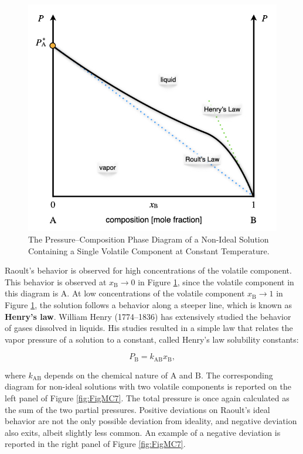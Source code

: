 \documentclass[
  9pt,
]{extbook}
\theoremstyle{definition}
\theoremstyle{definition}
\theoremstyle{definition}
\theoremstyle{remark}
\begin{document}
\begin{figure}

{\centering \includegraphics[width=0.6\linewidth]{./img/OEP_Figures.024} 

}

\caption{The Pressure–Composition Phase Diagram of a Non-Ideal Solution Containing a Single Volatile Component at Constant Temperature.}\label{fig:FigMC6}
\end{figure}

Raoult's behavior is observed for high concentrations of the volatile component. This behavior is observed at \(x_{\text{B}} \rightarrow 0\) in Figure \ref{fig:FigMC6}, since the volatile component in this diagram is \(\mathrm{A}\). At low concentrations of the volatile component \(x_{\text{B}} \rightarrow 1\) in Figure \ref{fig:FigMC6}, the solution follows a behavior along a steeper line, which is known as \textbf{Henry's law}. William Henry (1774--1836) has extensively studied the behavior of gases dissolved in liquids. His studies resulted in a simple law that relates the vapor pressure of a solution to a constant, called Henry's law solubility constants:

\begin{equation}
P_{\text{B}}=k_{\text{AB}} x_{\text{B}},
\label{eq:mc1b}
\end{equation}

where \(k_{\text{AB}}\) depends on the chemical nature of \(\mathrm{A}\) and \(\mathrm{B}\). The corresponding diagram for non-ideal solutions with two volatile components is reported on the left panel of Figure \ref{fig:FigMC7}. The total pressure is once again calculated as the sum of the two partial pressures. Positive deviations on Raoult's ideal behavior are not the only possible deviation from ideality, and negative deviation also exits, albeit slightly less common. An example of a negative deviation is reported in the right panel of Figure \ref{fig:FigMC7}.
\end{document}
